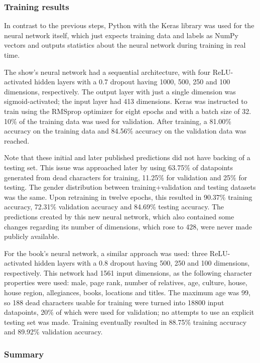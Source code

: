 \documentclass{bioinfo}
\begin{document}
\subsubsection{Training results}

In contrast to the previous steps, Python with the Keras library was used for the neural network itself, which just expects training data and labels as NumPy vectors and outputs statistics about the neural network during training in real time.

The show's neural network had a sequential architecture, with four ReLU-activated hidden layers with a 0.7 dropout having 1000, 500, 250 and 100 dimensions, respectively. The output layer with just a single dimension was sigmoid-activated; the input layer had 413 dimensions. Keras was instructed to train using the RMSprop optimizer for eight epochs and with a batch size of 32. 10\% of the training data was used for validation. After training, a 81.00\% accuracy on the training data and 84.56\% accuracy on the validation data was reached.

Note that these initial and later published predictions did not have backing of a testing set. This issue was approached later by using 63.75\% of datapoints generated from dead characters for training, 11.25\% for validation and 25\% for testing. The gender distribution between training+validation and testing datasets was the same. Upon retraining in twelve epochs, this resulted in 90.37\% training accuracy, 72.31\% validation accuracy and 84.69\% testing accuracy. The predictions created by this new neural network, which also contained some changes regarding its number of dimensions, which rose to 428, were never made publicly available.

For the book's neural network, a similar approach was used: three ReLU-activated hidden layers with a 0.8 dropout having 500, 250 and 100 dimensions, respectively. This network had 1561 input dimensions, as the following character properties were used: male, page rank, number of relatives, age, culture, house, house region, allegiances, books, locations and titles. The maximum age was 99, so 188 dead characters usable for training were turned into 18800 input datapoints, 20\% of which were used for validation; no attempts to use an explicit testing set was made. Training eventually resulted in 88.75\% training accuracy and 89.92\% validation accuracy.

\subsubsection{Summary}
\end{document}
